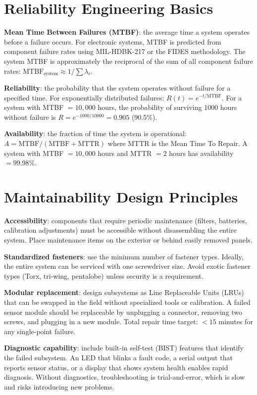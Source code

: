 \documentclass[11pt,letterpaper,twoside,openany]{book}
\begin{document}
\section{Reliability Engineering Basics}
\textbf{Mean Time Between Failures (MTBF)}: the average time a system operates before a failure occurs. For electronic systems, MTBF is predicted from component failure rates using MIL-HDBK-217 or the FIDES methodology. The system MTBF is approximately the reciprocal of the sum of all component failure rates: $\text{MTBF}_{\text{system}} \approx 1/\sum \lambda_i$.

\textbf{Reliability}: the probability that the system operates without failure for a specified time. For exponentially distributed failures: $R(t) = e^{-t/\text{MTBF}}$. For a system with MTBF $= 10{,}000$ hours, the probability of surviving 1000 hours without failure is $R = e^{-1000/10000} = 0.905$ (90.5\%).

\textbf{Availability}: the fraction of time the system is operational: $A = \text{MTBF}/(\text{MTBF} + \text{MTTR})$ where MTTR is the Mean Time To Repair. A system with MTBF $= 10{,}000$ hours and MTTR $= 2$ hours has availability $= 99.98\%$.

\section{Maintainability Design Principles}
\textbf{Accessibility}: components that require periodic maintenance (filters, batteries, calibration adjustments) must be accessible without disassembling the entire system. Place maintenance items on the exterior or behind easily removed panels.

\textbf{Standardized fasteners}: use the minimum number of fastener types. Ideally, the entire system can be serviced with one screwdriver size. Avoid exotic fastener types (Torx, tri-wing, pentalobe) unless security is a requirement.

\textbf{Modular replacement}: design subsystems as Line Replaceable Units (LRUs) that can be swapped in the field without specialized tools or calibration. A failed sensor module should be replaceable by unplugging a connector, removing two screws, and plugging in a new module. Total repair time target: $< 15$ minutes for any single-point failure.

\textbf{Diagnostic capability}: include built-in self-test (BIST) features that identify the failed subsystem. An LED that blinks a fault code, a serial output that reports sensor status, or a display that shows system health enables rapid diagnosis. Without diagnostics, troubleshooting is trial-and-error, which is slow and risks introducing new problems.
\end{document}

